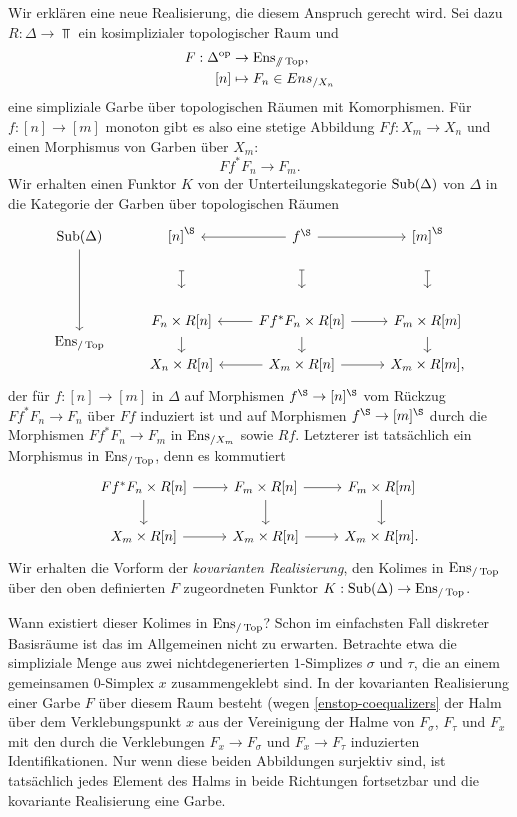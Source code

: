 Wir erklären eine neue Realisierung, die diesem Anspruch gerecht wird.
Sei dazu $R: \Delta \to \Top$ ein kosimplizialer topologischer Raum
und
\begin{align*}
  F: \Delta^\mathrm{op} &\to \operatorname{Ens}_{\mathbin{/\mkern-6mu/} \operatorname{Top}}, \\
  [n] &\mapsto F_n \in Ens_{/X_n}
   \end{align*}
eine simpliziale Garbe über topologischen Räumen mit Komorphismen. Für
$f: [n] \to [m]$ monoton gibt es also eine stetige Abbildung $Ff: X_m
\to X_n$ und einen Morphismus von Garben über $X_m$:
\[ Ff^* F_n \to F_m .\]
Wir erhalten einen Funktor $K$ von der Unterteilungskategorie
$\operatorname{Sub}(\Delta)$ von $\Delta$ in die Kategorie der Garben über
topologischen Räumen
\begin{equation} \label{dg:cov-real}
  \begin{tikzcd}
    \Sub(\Delta) \arrow{dd}
    & {[n]}^\S \dar[mapsto, shorten <= 3em, yshift=1.5em]
    & \lar f^\S \dar[mapsto, shorten <= 3em, yshift=1.5em] \rar
    & {[m]}^\S \dar[mapsto, shorten <= 3em, yshift=1.5em] \\[25]
    & F_n \times R[n]
    & \lar Ff^* F_n \times R[n] \rar
    & F_m \times R[m] \\[-2em]
    \Ens_{/\Top}
    & \dar[shorten <= -1em]
    & \dar[shorten <= -1em]
    & \dar[shorten <= -1em] \\[-2em]
    & X_n \times R[n]
    & \lar X_m \times R[n] \rar
    & X_m \times R[m],
  \end{tikzcd}
\end{equation}
der für $f: [n] \to [m]$ in $\Delta$ auf Morphismen $f^\S \to [n]^\S$
vom Rückzug $Ff^* F_n \to F_n$ über $Ff$ induziert ist und auf
Morphismen $f^\S \to [m]^\S$ durch die Morphismen $Ff^* F_n \to F_m$
in $\operatorname{Ens}_{/X_m}$ sowie $Rf$. Letzterer ist tatsächlich ein Morphismus
in $\operatorname{Ens}_{/\operatorname{Top}}$, denn es kommutiert
\[ \begin{tikzcd}
  Ff^* F_n \times R[n] \dar \rar
  & F_m \times R[n] \dar \rar
  & F_m \times R[m] \dar \\
  X_m \times R[n] \rar
  & X_m \times R[n] \rar
  & X_m \times R[m].
\end{tikzcd} \]
Wir erhalten die Vorform der \emph{kovarianten Realisierung}, den
Kolimes in $\operatorname{Ens}_{/\operatorname{Top}}$ über den oben definierten $F$ zugeordneten
Funktor $K: \operatorname{Sub}(\Delta) \to \operatorname{Ens}_{/\operatorname{Top}}$.

Wann existiert dieser Kolimes in $\operatorname{Ens}_{/\operatorname{Top}}$? Schon im einfachsten Fall
diskreter Basisräume ist das im Allgemeinen nicht zu
erwarten. Betrachte etwa die simpliziale Menge aus zwei
nichtdegenerierten $1$-Simplizes $\sigma$ und $\tau$, die an einem
gemeinsamen $0$-Simplex $x$ zusammengeklebt sind. In der kovarianten
Realisierung einer Garbe $F$ über diesem Raum besteht (wegen
\ref{enstop-coequalizers} der Halm über dem Verklebungspunkt $x$ aus
der Vereinigung der Halme von $F_\sigma$, $F_\tau$ und $F_x$ mit den
durch die Verklebungen $F_x \to F_\sigma$ und $F_x \to F_\tau$
induzierten Identifikationen. Nur wenn diese beiden Abbildungen
surjektiv sind, ist tatsächlich jedes Element des Halms in beide
Richtungen fortsetzbar und die kovariante Realisierung eine Garbe.

